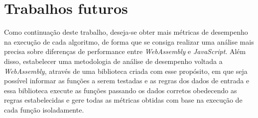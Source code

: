 \section{Trabalhos futuros}
\label{ssec:future-works}

Como continuação deste trabalho, deseja-se obter mais métricas de desempenho na execução
de cada algoritmo, de forma que se consiga realizar uma análise mais precisa sobre
diferenças de performance entre \textit{WebAssembly} e \textit{JavaScript}. Além disso,
estabelecer uma metodologia de análise de desempenho voltada a \textit{WebAssembly},
através de uma biblioteca criada com esse propósito, em que seja possível informar as
funções a serem testadas e as regras dos dados de entrada e essa biblioteca execute as
funções passando os dados corretos obedecendo as regras estabelecidas e gere todas as
métricas obtidas com base na execução de cada função isoladamente.


\glsaddall